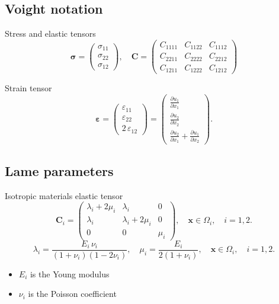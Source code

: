 \documentclass[compress,pdf,mathserif]{beamer}
\begin{document}
\subsection{Voight notation}
\begin{frame}
    \centering
    Stress and elastic tensors 
    \[
        \bm{\sigma} = \left(
        \begin{matrix}\sigma_{11}\\ \sigma_{22}\\ \sigma_{12}\end{matrix}
        \right), \quad
        \bm{C} = \left( \begin{matrix}
        C_{1111} & C_{1122} & C_{1112}  \\
        C_{2211} & C_{2222} & C_{2212}  \\
        C_{1211} & C_{1222} & C_{1212}  
        \end{matrix}  \right)
    \]

    Strain tensor
    \[
        \bm{\varepsilon} = \left(
        \begin{matrix}\varepsilon_{11}\\ \varepsilon_{22}\\ 2\, \varepsilon_{12}\end{matrix}
        \right) = \left( \begin{matrix}\frac{\partial u_1}{\partial x_1}\\ \frac{\partial u_2}{\partial x_2} \\ \frac{\partial u_2}{\partial x_1} + \frac{\partial u_1}{\partial x_2} \end{matrix} \right).
    \]
\end{frame}

\subsection{Lame parameters}
\begin{frame}
    \centering
    Isotropic materials elastic tensor
    \[
    \bm{C}_i = \left( \begin{matrix}
    \lambda_i+2\mu_i & \lambda_i & 0  \\
    \lambda_i & \lambda_i+2\mu_i & 0  \\
    0 & 0 & \mu_i 
    \end{matrix}  \right), \quad \bm{x} \in \Omega_i, \quad i=1,2.
    \]
    \[
    \lambda_i = \frac{E_i\, \nu_i}{(1 + \nu_i) (1 - 2 \nu_i)}, \quad
    \mu_i = \frac{E_i}{2 (1 + \nu_i)}, \quad \bm{x} \in \Omega_i, \quad i=1,2.
    \]
    \begin{itemize}
        \item $E_i$ is the Young modulus
        \item $\nu_i$ is the Poisson coefficient
    \end{itemize}
\end{frame}
\end{document}
